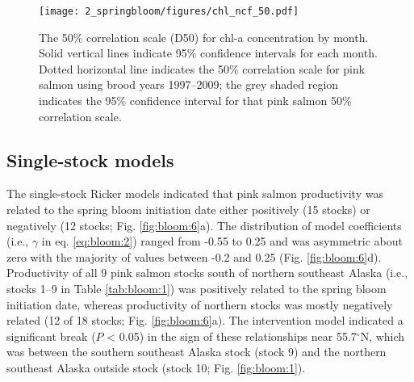 \begin{figure}[htbp]
  \centering \texttt{[image: 2\_springbloom/figures/chl\_ncf\_50.pdf]}
  \caption[The 50\% correlation scale for chl-a concentration by month]{The
           50\% correlation scale (D50) for chl-a concentration by month.  Solid
           vertical lines indicate 95\% confidence intervals for each month.
           Dotted horizontal line indicates the 50\% correlation scale for pink
           salmon using brood years 1997--2009; the grey shaded region indicates
           the 95\% confidence interval for that pink salmon 50\% correlation
           scale.}
  \label{fig:bloom:5}
\end{figure}


\subsection{Single-stock models}

The single-stock Ricker models indicated that pink salmon productivity was
related to the spring bloom initiation date either positively (15 stocks) or
negatively (12 stocks; Fig. \ref{fig:bloom:6}a). The distribution of model
coefficients (i.e., \(\gamma\) in eq. \ref{eq:bloom:2}) ranged from -0.55 to
0.25 and was asymmetric about zero with the majority of values between -0.2 and
0.25 (Fig.  \ref{fig:bloom:6}d).  Productivity of all 9 pink salmon stocks south
of northern southeast Alaska (i.e., stocks 1--9 in Table \ref{tab:bloom:1}) was
positively related to the spring bloom initiation date, whereas productivity of
northern stocks was mostly negatively related (12 of 18 stocks; Fig.
\ref{fig:bloom:6}a). The intervention model indicated a significant break ($P$
\textless{} 0.05) in the sign of these relationships near 55.7$^{\circ}$N, which
was between the southern southeast Alaska stock (stock 9) and the northern
southeast Alaska outside stock (stock 10; Fig.  \ref{fig:bloom:1}).

